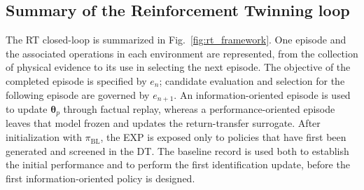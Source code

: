 \documentclass[journal]{IEEEtran}
\begin{document}
\subsection{Summary of the Reinforcement Twinning loop}
The RT closed-loop is summarized in Fig.~\ref{fig:rt_framework}. One episode and the associated operations in each environment are represented, from the collection of physical evidence to its use in selecting the next episode. The objective of the completed episode is specified by $e_n$; candidate evaluation and selection for the following episode are governed by $e_{n+1}$. An information-oriented episode is used to update $\boldsymbol{\theta}_p$ through factual replay, whereas a performance-oriented episode leaves that model frozen and updates the return-transfer surrogate. After initialization with $\pi_{\mathrm{BL}}$, the EXP is exposed only to policies that have first been generated and screened in the DT. The baseline record is used both to establish the initial performance and to perform the first identification update, before the first information-oriented policy is designed.
\end{document}
